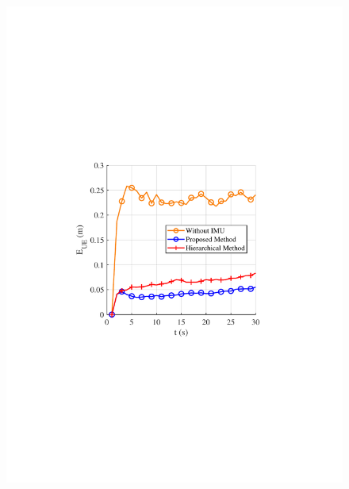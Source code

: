 \documentclass[journal,12pt,onecolumn,draftclsnofoot,]{IEEEtran}
\begin{document}
\begin{figure}
{\hspace{-0mm}\includegraphics[scale=0.46]{9-4.pdf}\hspace{-0mm}
}
\quad
\subfloat[]{
}
\end{figure}
\end{document}

